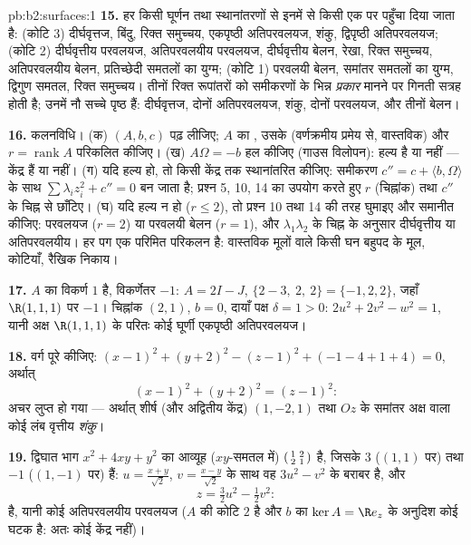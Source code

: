 \begin{solution}{pb:b2:surfaces:1}
\textbf{15.} हर  किसी घूर्णन तथा स्थानांतरणों से इनमें से
किसी एक पर पहुँचा दिया जाता है: (कोटि 3) दीर्घवृत्तज, बिंदु, रिक्त
समुच्चय, एकपृष्ठी अतिपरवलयज, शंकु, द्विपृष्ठी अतिपरवलयज; (कोटि 2)
दीर्घवृत्तीय परवलयज, अतिपरवलयीय परवलयज, दीर्घवृत्तीय बेलन, रेखा,
रिक्त समुच्चय, अतिपरवलयीय बेलन, प्रतिच्छेदी समतलों का युग्म; (कोटि
1) परवलयी बेलन, समांतर समतलों का युग्म, द्विगुण समतल, रिक्त
समुच्चय। तीनों रिक्त रूपांतरों को समीकरणों के भिन्न \emph{
प्रकार} मानने पर गिनती सत्रह होती है; उनमें नौ सच्चे पृष्ठ हैं:
दीर्घवृत्तज, दोनों अतिपरवलयज, शंकु, दोनों परवलयज, और तीनों बेलन।

\textbf{16.} कलनविधि। (क) $(A, b, c)$ पढ़ लीजिए; $A$ का , उसके  (वर्णक्रमीय प्रमेय से, वास्तविक) और
$r = \operatorname{rank}A$ परिकलित कीजिए। (ख) $A\Omega = -b$ हल कीजिए (गाउस विलोपन): हल्य है या
नहीं --- केंद्र हैं या नहीं। (ग) यदि हल्य हो, तो किसी केंद्र तक
स्थानांतरित कीजिए: समीकरण $c''
= c + \langle b, \Omega\rangle$ के साथ $\sum\lambda_iz_i^2 + c'' = 0$ बन जाता है; प्रश्न 5,
10, 14 का उपयोग करते हुए $r$ (चिह्नांक) तथा $c''$ के चिह्न से
छाँटिए। (घ) यदि हल्य न हो ($r \leq 2$), तो प्रश्न 10 तथा 14 की तरह
घुमाइए और समानीत कीजिए: परवलयज ($r = 2$) या परवलयी बेलन ($r = 1$), और
$\lambda_1\lambda_2$ के चिह्न के अनुसार दीर्घवृत्तीय या अतिपरवलयीय। हर पग एक
परिमित परिकलन है: वास्तविक मूलों वाले किसी घन बहुपद के मूल,
कोटियाँ, रैखिक निकाय।

\textbf{17.} $A$ का विकर्ण $1$ है, विकर्णेतर $-1$: $A = 2I
- J$,
 $\{2 - 3,\ 2,\ 2\} = \{-1, 2, 2\}$, जहाँ $\R(1,1,1)$ पर $-1$। चिह्नांक $(2,1)$, $b = 0$, दायाँ पक्ष
$\delta = 1 > 0$: $2u^2 + 2v^2 - w^2 = 1$, यानी अक्ष $\R(1,1,1)$ के परितः कोई घूर्णी एकपृष्ठी
अतिपरवलयज।

\textbf{18.} वर्ग पूरे कीजिए: $(x-1)^2 + (y+2)^2 - (z-1)^2 +
(-1 - 4 + 1 + 4) = 0$, अर्थात्
\[
(x-1)^2 + (y+2)^2 = (z-1)^2 :
\]
अचर लुप्त हो गया --- अर्थात् शीर्ष (और अद्वितीय केंद्र) $(1, -2, 1)$ तथा
$Oz$ के समांतर अक्ष वाला कोई लंब वृत्तीय \emph{शंकु}।

\textbf{19.} द्विघात भाग $x^2 + 4xy + y^2$ का आव्यूह ($xy$-समतल में) $\begin{psmallmatrix}1 & 2\\ 2 & 1\end{psmallmatrix}$ है,
जिसके  $3$ ($(1,1)$ पर) तथा $-1$ ($(1,-1)$ पर) हैं: $u = \frac{x+y}{\sqrt2}$,
$v =
\frac{x-y}{\sqrt2}$ के साथ वह $3u^2 - v^2$ के बराबर है, और 
\[
z = \tfrac32u^2 - \tfrac12v^2 :
\]
है, यानी कोई अतिपरवलयीय परवलयज ($A$ की कोटि $2$ है और $b$
का $\ker A = \R e_z$ के अनुदिश कोई घटक है: अतः कोई केंद्र नहीं)।


\end{solution}
